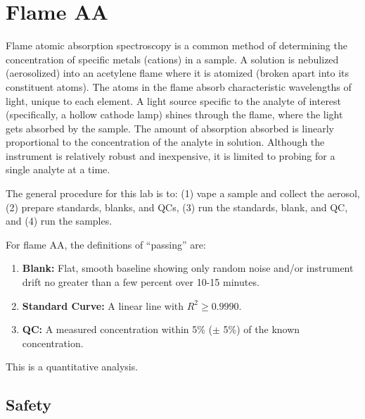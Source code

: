 \documentclass[]{tufte-book}
\providecommand{\tightlist}{%
  \setlength{\itemsep}{0pt}\setlength{\parskip}{0pt}}
\begin{document}
\newpage

\hypertarget{flame-aa}{%
\section{Flame AA}\label{flame-aa}}

Flame atomic absorption spectroscopy is a common method of determining the concentration of specific metals (cations) in a sample. A solution is nebulized (aerosolized) into an acetylene flame where it is atomized (broken apart into its constituent atoms). The atoms in the flame absorb characteristic wavelengths of light, unique to each element. A light source specific to the analyte of interest (specifically, a hollow cathode lamp) shines through the flame, where the light gets absorbed by the sample. The amount of absorption absorbed is linearly proportional to the concentration of the analyte in solution. Although the instrument is relatively robust and inexpensive, it is limited to probing for a single analyte at a time.

The general procedure for this lab is to: (1) vape a sample and collect the aerosol, (2) prepare standards, blanks, and QCs, (3) run the standards, blank, and QC, and (4) run the samples.

For flame AA, the definitions of ``passing'' are:

\begin{enumerate}
\def\labelenumi{\arabic{enumi}.}
\tightlist
\item
  \textbf{Blank:} Flat, smooth baseline showing only random noise and/or instrument drift no greater than a few percent over 10-15 minutes.\\
\item
  \textbf{Standard Curve:} A linear line with \(R^2 \ge 0.9990\).\\
\item
  \textbf{QC:} A measured concentration within 5\% (\(\pm\) 5\%) of the known concentration.
\end{enumerate}

This is a quantitative analysis.

\hypertarget{safety-1}{%
\subsection*{Safety}\label{safety-1}}
\end{document}
